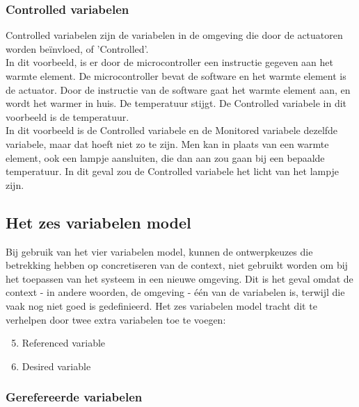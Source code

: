 \documentclass{article}
\begin{document}
			\subsubsection{Controlled variabelen}

			Controlled variabelen zijn de variabelen in de omgeving die door de actuatoren worden beïnvloed, of 'Controlled'. \\
			In dit voorbeeld, is er door de microcontroller een instructie gegeven aan het warmte element. De microcontroller bevat de software en het warmte element is de actuator. Door de instructie van de software gaat het warmte element aan, en wordt het warmer in huis. De temperatuur stijgt. De Controlled variabele in dit voorbeeld is de temperatuur. \\
			In dit voorbeeld is de Controlled variabele en de Monitored variabele dezelfde variabele, maar dat hoeft niet zo te zijn. Men kan in plaats van een warmte element, ook een lampje aansluiten, die dan aan zou gaan bij een bepaalde temperatuur. In dit geval zou de Controlled variabele het licht van het lampje zijn. \par

		\subsection{Het zes variabelen model}

		Bij gebruik van het vier variabelen model, kunnen de ontwerpkeuzes die betrekking hebben op concretiseren van de context, niet gebruikt worden om bij het toepassen van het systeem in een nieuwe omgeving. Dit is het geval omdat de context - in andere woorden, de omgeving - één van de variabelen is, terwijl die vaak nog niet goed is gedefinieerd. Het zes variabelen model tracht dit te verhelpen door twee extra variabelen toe te voegen: \par

		\begin{enumerate}
			\setcounter{enumi}{4}
			\item Referenced variable
			\item Desired variable
		\end{enumerate}

			\subsubsection{Gerefereerde variabelen}
			
\end{document}
